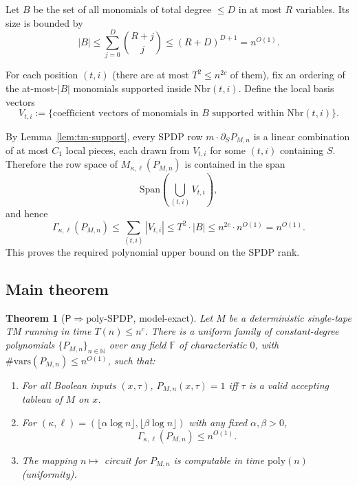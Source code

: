 \documentclass[12pt]{article}
\newtheorem{theorem}{Theorem}
\theoremstyle{definition}
\theoremstyle{definition}
\theoremstyle{remark}
\theoremstyle{remark}
\begin{document}
Let $B$ be the set of all monomials of total degree $\leq D$ in at most $R$ variables. Its size is bounded by
\begin{equation}\label{eq:basis-size}
|B| \leq \sum_{j=0}^D \binom{R+j}{j} \leq (R+D)^{D+1} = n^{O(1)}.
\end{equation}

For each position $(t,i)$ (there are at most $T^2 \leq n^{2c}$ of them), fix an ordering of the at-most-$|B|$ monomials supported inside $\mathrm{Nbr}(t,i)$. Define the local basis vectors
\[
V_{t,i} := \{\text{coefficient vectors of monomials in } B \text{ supported within } \mathrm{Nbr}(t,i)\}.
\]

By Lemma~\ref{lem:tm-support}, every SPDP row $m \cdot \partial_S P_{M,n}$ is a linear combination of at most $C_1$ local pieces, each drawn from $V_{t,i}$ for some $(t,i)$ containing $S$. Therefore the row space of $M_{\kappa,\ell}(P_{M,n})$ is contained in the span
\[
\mathrm{Span}\!\left(\bigcup_{(t,i)} V_{t,i}\right),
\]
and hence
\begin{equation}\label{eq:pm-rank-bound}
\Gamma_{\kappa,\ell}(P_{M,n}) \leq \sum_{(t,i)} |V_{t,i}| \leq T^2 \cdot |B| \leq n^{2c} \cdot n^{O(1)} = n^{O(1)}.
\end{equation}
This proves the required polynomial upper bound on the SPDP rank.

\subsection{Main theorem}

\begin{theorem}[$\mathsf{P} \Rightarrow \mathrm{poly\text{-}SPDP}$, model-exact]\label{thm:PtoPolySPDP}
Let $M$ be a deterministic single-tape TM running in time $T(n) \leq n^c$. There is a uniform family of constant-degree polynomials $\{P_{M,n}\}_{n \in \mathbb{N}}$ over any field $\mathbb{F}$ of characteristic $0$, with $\#\mathrm{vars}(P_{M,n}) \leq n^{O(1)}$, such that:
\begin{enumerate}
\item For all Boolean inputs $(x,\tau)$, $P_{M,n}(x,\tau) = 1$ iff $\tau$ is a valid accepting tableau of $M$ on $x$.
\item For $(\kappa,\ell) = (\lfloor \alpha \log n \rfloor, \lfloor \beta \log n \rfloor)$ with any fixed $\alpha, \beta > 0$,
\[
\Gamma_{\kappa,\ell}(P_{M,n}) \leq n^{O(1)}.
\]
\item The mapping $n \mapsto$ circuit for $P_{M,n}$ is computable in time $\mathrm{poly}(n)$ (uniformity).
\end{enumerate}
\end{theorem}
\end{document}
